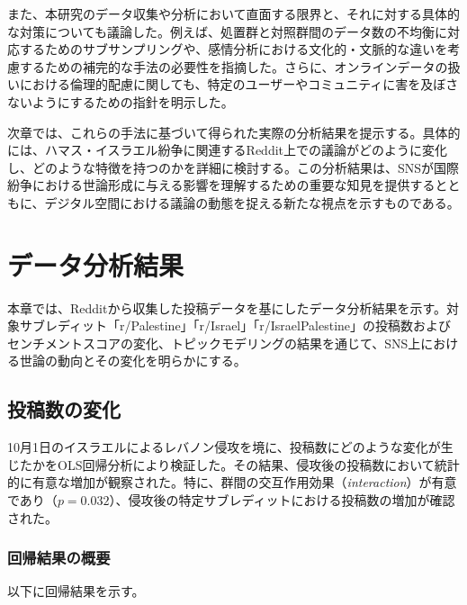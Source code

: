 \documentclass[11pt, a4j]{jreport}
\begin{document}
    また、本研究のデータ収集や分析において直面する限界と、それに対する具体的な対策についても議論した。例えば、処置群と対照群間のデータ数の不均衡に対応するためのサブサンプリングや、感情分析における文化的・文脈的な違いを考慮するための補完的な手法の必要性を指摘した。さらに、オンラインデータの扱いにおける倫理的配慮に関しても、特定のユーザーやコミュニティに害を及ぼさないようにするための指針を明示した。

    次章では、これらの手法に基づいて得られた実際の分析結果を提示する。具体的には、ハマス・イスラエル紛争に関連するReddit上での議論がどのように変化し、どのような特徴を持つのかを詳細に検討する。この分析結果は、SNSが国際紛争における世論形成に与える影響を理解するための重要な知見を提供するとともに、デジタル空間における議論の動態を捉える新たな視点を示すものである。

    \chapter{データ分析結果}
    本章では、Redditから収集した投稿データを基にしたデータ分析結果を示す。対象サブレディット「r/Palestine」「r/Israel」「r/IsraelPalestine」の投稿数およびセンチメントスコアの変化、トピックモデリングの結果を通じて、SNS上における世論の動向とその変化を明らかにする。

    \section{投稿数の変化}
    10月1日のイスラエルによるレバノン侵攻を境に、投稿数にどのような変化が生じたかをOLS回帰分析により検証した。その結果、侵攻後の投稿数において統計的に有意な増加が観察された。特に、群間の交互作用効果（\textit{interaction}）が有意であり（$p = 0.032$）、侵攻後の特定サブレディットにおける投稿数の増加が確認された。

    \subsection*{回帰結果の概要}
    以下に回帰結果を示す。

    \begin{table}[H]
        \centering
        \caption{投稿数の変化に関するOLS回帰結果}
        \label{tab:ols_results}
    \end{table}
\end{document}
